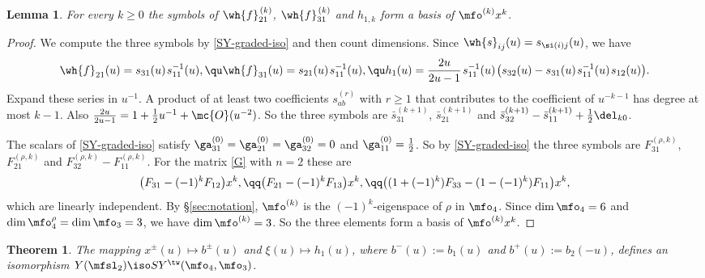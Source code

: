 \documentclass{amsart}
\newtheorem{thm}[theorem]{Theorem}
\newtheorem{lemma}[theorem]{Lemma}
\numberwithin{equation}{section}
\theoremstyle{remark}
\renewcommand{\,}{\kern 0.1em} %
\begin{document}
\begin{lemma} \label{L:o4o3-symbols}
%
For every $k\ge0$ the symbols of $\wh{f}^{\,(k)}_{21}$, $\wh{f}^{\,(k)}_{31}$ and $h_{1,k}$ form a
basis of $\mfo^{(k)}x^k$.
%
\end{lemma}

\begin{proof}
%
We compute the three symbols by \eqref{SY-graded-iso} and then count dimensions. Since
$\wh{s}_{ij}(u)=s_{\si(i)j}(u)$, we have
%
\[
\wh{f}_{21}(u) = s_{31}(u)\,s^{-1}_{11}(u) , \qu
\wh{f}_{31}(u) = s_{21}(u)\,s^{-1}_{11}(u) , \qu
h_1(u) = \frac{2u}{2u-1}\,s^{-1}_{11}(u)\,\big(s_{32}(u)-s_{31}(u)\,s^{-1}_{11}(u)\,s_{12}(u)\big) .
\]
%
Expand these series in $u^{-1}$. A product of at least two coefficients $s^{(r)}_{ab}$ with $r\ge1$
that contributes to the coefficient of $u^{-k-1}$ has degree at most $k-1$. Also
$\frac{2u}{2u-1}=1+\tfrac12u^{-1}+\mc{O}(u^{-2})$. So the three symbols are
$\bar{s}^{(k+1)}_{31}$, $\bar{s}^{(k+1)}_{21}$ and
$\bar{s}^{(k+1)}_{32}-\bar{s}^{(k+1)}_{11}+\tfrac12\del_{k0}$.

The scalars of \eqref{SY-graded-iso} satisfy $\ga^{(0)}_{31}=\ga^{(0)}_{21}=\ga^{(0)}_{32}=0$
and $\ga^{(0)}_{11}=\tfrac12$. So by \eqref{SY-graded-iso} the three symbols are
$F^{(\rho,k)}_{31}$, $F^{(\rho,k)}_{21}$ and $F^{(\rho,k)}_{32}-F^{(\rho,k)}_{11}$. For the
matrix \eqref{G} with $n=2$ these are
%
\[
\big(F_{31}-(-1)^kF_{12}\big)x^k , \qq
\big(F_{21}-(-1)^kF_{13}\big)x^k , \qq
\big((1+(-1)^k)F_{33}-(1-(-1)^k)F_{11}\big)x^k ,
\]
%
which are linearly independent. By \S\ref{sec:notation}, $\mfo^{(k)}$ is the $(-1)^k$-eigenspace of
$\rho$ in $\mfo_4$. Since $\dim\mfo_4=6$ and $\dim\mfo_4^\rho=\dim\mfo_3=3$, we have
$\dim\mfo^{(k)}=3$. So the three elements form a basis of $\mfo^{(k)}x^k$.
%
\end{proof}

\begin{thm} \label{T:o4o3}
%
The mapping $x^\pm(u)\mapsto b^\pm(u)$ and $\xi(u)\mapsto h_1(u)$, where $b^-(u) := b_1(u)$ and
$b^+(u) := b_2(-u)$, defines an isomorphism $Y(\mfsl_2) \iso SY^\tw(\mfo_4,\mfo_3)$.
%
\end{thm}
\end{document}
